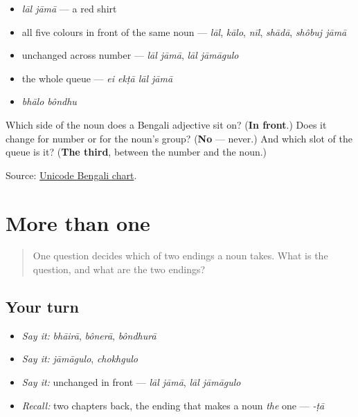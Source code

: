 \begin{itemize}
\raggedright
  \item \emph{lāl jāmā} — a red shirt
  \item all five colours in front of the same noun — \emph{lāl}, \emph{kālo}, \emph{nīl}, \emph{shādā}, \emph{shôbuj jāmā}
  \item unchanged across number — \emph{lāl jāmā}, \emph{lāl jāmāgulo}
  \item the whole queue — \emph{ei ekṭā lāl jāmā}
  \item \emph{bhālo bôndhu}
\end{itemize}

\begin{tcolorbox}[breakable,colback=teal!4,colframe=teal!35!black,title={Before you move on}]
Which side of the noun does a Bengali adjective sit on? (\textbf{In front}.) Does it change for number or for the noun's group? (\textbf{No} — never.) And which slot of the queue is it? (\textbf{The third}, between the number and the noun.)

Source: \href{https://www.unicode.org/charts/PDF/U0980.pdf}{Unicode Bengali chart}.
\end{tcolorbox}
\section[\texorpdfstring{\bn{রা} · \bn{গুলো} · \bn{লাল} … (-rā · -gulo …)}{রা · গুলো · লাল … (-rā · -gulo …)}]{More than one}

\label{lesson:BN-R22-more-than-one}



\begin{quote}
One question decides which of two endings a noun takes. What is the question, and what are the two endings?
\end{quote}

\subsection*{Your turn}
\begin{itemize}
\raggedright
  \item \emph{Say it:} \emph{bhāirā}, \emph{bônerā}, \emph{bôndhurā}
  \item \emph{Say it:} \emph{jāmāgulo}, \emph{chokhgulo}
  \item \emph{Say it:} unchanged in front — \emph{lāl jāmā}, \emph{lāl jāmāgulo}
  \item \emph{Recall:} two chapters back, the ending that makes a noun \emph{the} one — \emph{-ṭā}
\end{itemize}

